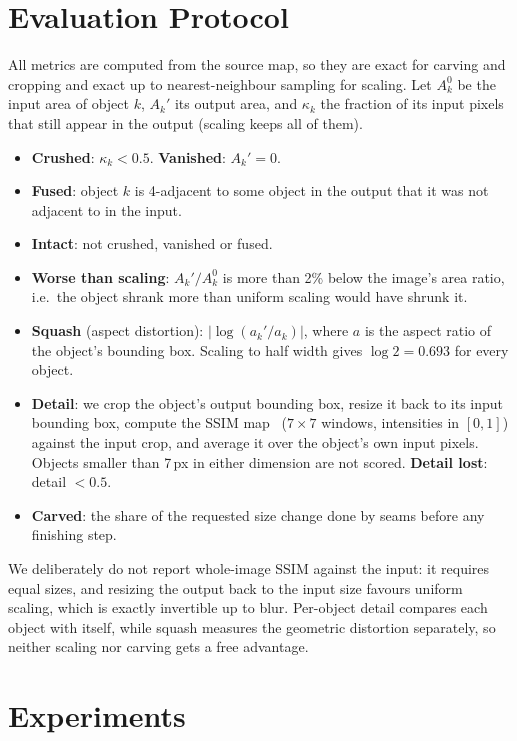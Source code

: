 \documentclass[conference]{IEEEtran}
\begin{document}
\section{Evaluation Protocol}

All metrics are computed from the source map, so they are exact for carving and cropping and exact up to nearest-neighbour sampling for scaling. Let $A_k^0$ be the input area of object $k$, $A_k'$ its output area, and $\kappa_k$ the fraction of its input pixels that still appear in the output (scaling keeps all of them).
\begin{itemize}
\item \textbf{Crushed}: $\kappa_k < 0.5$. \textbf{Vanished}: $A_k' = 0$.
\item \textbf{Fused}: object $k$ is 4-adjacent to some object in the output that it was not adjacent to in the input.
\item \textbf{Intact}: not crushed, vanished or fused.
\item \textbf{Worse than scaling}: $A_k'/A_k^0$ is more than 2\% below the image's area ratio, i.e.\ the object shrank more than uniform scaling would have shrunk it.
\item \textbf{Squash} (aspect distortion): $|\log(a_k'/a_k)|$, where $a$ is the aspect ratio of the object's bounding box. Scaling to half width gives $\log 2 = 0.693$ for every object.
\item \textbf{Detail}: we crop the object's output bounding box, resize it back to its input bounding box, compute the SSIM map~\cite{wang2004ssim} ($7\times7$ windows, intensities in $[0,1]$) against the input crop, and average it over the object's own input pixels. Objects smaller than 7\,px in either dimension are not scored. \textbf{Detail lost}: detail $< 0.5$.
\item \textbf{Carved}: the share of the requested size change done by seams before any finishing step.
\end{itemize}
We deliberately do not report whole-image SSIM against the input: it requires equal sizes, and resizing the output back to the input size favours uniform scaling, which is exactly invertible up to blur. Per-object detail compares each object with itself, while squash measures the geometric distortion separately, so neither scaling nor carving gets a free advantage.

\section{Experiments}
\end{document}
